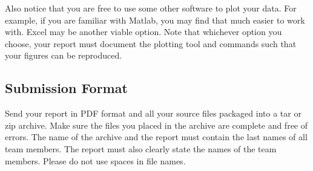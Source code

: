 \documentclass[a4paper,10pt]{article}
\begin{document}
Also notice that you are free to use some other software to plot your data.
For example, if you are familiar with Matlab, you may find that much easier to work with.
Excel may be another viable option.
Note that whichever option you choose, your report must document the plotting tool and commands such that your figures can be reproduced.

\subsection*{Submission Format}

Send your report in PDF format and all your source files packaged into a tar or zip archive.
Make sure the files you placed in the archive are complete and free of errors.
The name of the archive and the report must contain the last names of all team members.
The report must also clearly state the names of the team members.
Please do not use spaces in file names.



\footnotesize


\end{document}
